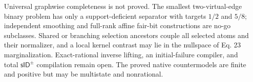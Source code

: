 Universal graphwise completeness is not proved. The smallest two-virtual-edge binary problem has only a support-deficient separator with targets \(1/2\) and \(5/8\); independent smoothing and full-rank affine fair-bit constructions are no-go subclasses. Shared or branching selection ancestors couple all selected atoms and their normalizer, and a local kernel contrast may lie in the nullspace of Eq. 23 marginalization. Exact-rational inverse lifting, an initial-failure compiler, and total \(\mathsf{sID}^{\pm}\) compilation remain open. The proved native countermodels are finite and positive but may be multistate and nonrational.